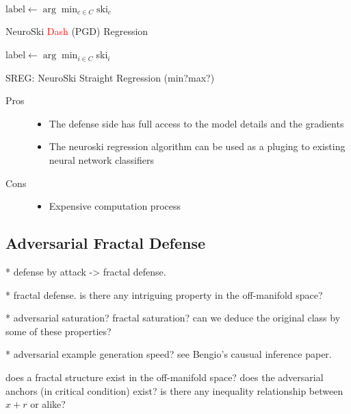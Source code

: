 \documentclass[twocolumn]{article}
\begin{document}
\begin{algorithm}
	\SetAlgoLined
	$\text{label} \leftarrow \arg\min_{c\in C} \text{ski}_c$\;
	\caption{NeuroSki \textcolor{red}{Dash} (PGD) Regression}
\end{algorithm}

\begin{algorithm}
	\SetAlgoLined	
	label$\leftarrow \arg\min_{i\in C} $ski$_i$\;	
	\caption{SREG: NeuroSki Straight Regression (min?max?)}
\end{algorithm}


\begin{description}
	\item[Pros] \begin{itemize}
		\item The defense side has full access to the model details
			and the gradients
		\item The neuroski regression algorithm can be used as a pluging
		to existing neural network classifiers
	\end{itemize}
	\item[Cons] \begin{itemize}
		\item Expensive computation process
	\end{itemize}
\end{description}


\subsection{Adversarial Fractal Defense}

* defense by attack -> fractal defense.

* fractal defense. is there any intriguing property in the off-manifold space?

* adversarial saturation? fractal saturation? can we deduce the original class by some of these properties?

* adversarial example generation speed? see Bengio's causual inference paper.

does a fractal structure exist in the off-manifold space? does the adversarial anchors (in critical condition) exist? is there any inequality relationship between $x+r$ or alike?
\end{document}
